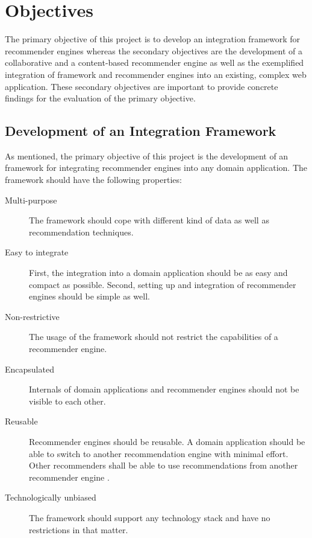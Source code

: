 \section{Objectives}
\label{intro-objectives}

The primary objective of this project is to develop an integration framework for recommender engines whereas the secondary objectives are the development of a collaborative and a content-based recommender engine as well as the exemplified integration of framework and recommender engines into an existing, complex web application. These secondary objectives are important to provide concrete findings for the evaluation of the primary objective.

\subsection{Development of an Integration Framework}
\label{intro-objectives-framework}

As mentioned, the primary objective of this project is the development of an framework for integrating recommender engines into any domain application. The framework should have the following properties:

\begin{description}
    \item[Multi-purpose] The framework should cope with different kind of data as well as recommendation techniques.
    \item[Easy to integrate] First, the integration into a domain application should be as easy and compact as possible. Second, setting up and integration of recommender engines should be simple as well.
    \item[Non-restrictive] The usage of the framework should not restrict the capabilities of a recommender engine.
    \item[Encapsulated] Internals of domain applications and recommender engines should not be visible to each other.
    \item[Reusable] Recommender engines should be reusable. A domain application should be able to switch to another recommendation engine with minimal effort. Other recommenders shall be able to use recommendations from another recommender engine \cite{manouselis07}.
    \item[Technologically unbiased] The framework should support any technology stack and have no restrictions in that matter.
\end{description}

